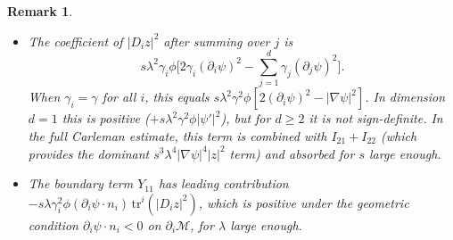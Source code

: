 \documentclass[11pt,oneside,leqno]{amsart}
\numberwithin{equation}{section}
\numberwithin{equation}{section}
\newtheorem{remark}[theorem]{Remark}
\begin{document}
\begin{remark}
\begin{itemize}
    \item
    The coefficient of $|D_{i}z|^{2}$ after summing over $j$ is
    \begin{equation*}
        s\lambda^{2}\gamma_{i}\phi\bigg[2\gamma_{i}(\partial_{i}\psi)^{2}
        -\sum_{j=1}^{d}\gamma_{j}(\partial_{j}\psi)^{2}\bigg].
    \end{equation*}
    When $\gamma_{i}=\gamma$ for all $i$, this equals
    $s\lambda^{2}\gamma^{2}\phi[2(\partial_{i}\psi)^{2}-|\nabla\psi|^{2}]$.
    In dimension $d=1$ this is positive ($+s\lambda^{2}\gamma^{2}\phi|\psi'|^{2}$),
    but for $d\geq 2$ it is not sign-definite. In the full Carleman estimate,
    this term is combined with $I_{21}+I_{22}$ (which provides
    the dominant $s^{3}\lambda^{4}|\nabla\psi|^{4}|z|^{2}$ term)
    and absorbed for $s$ large enough.
    \item The boundary term
    $Y_{11}$ has leading contribution
    $-s\lambda\gamma_{i}^{2}\phi(\partial_{i}\psi\cdot n_{i})\,
    \mathrm{tr}^{i}(|D_{i}z|^{2})$,
    which is positive under the geometric condition
    $\partial_{i}\psi\cdot n_{i}<0$ on $\partial_{i}\mathcal{M}$,
    for $\lambda$ large enough.
\end{itemize}
\end{remark}

\end{document}

